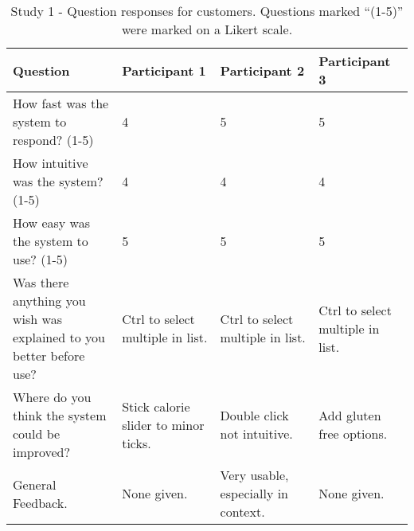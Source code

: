 \begin{table}[h]
    \centering
    \begin{tabular}{ |p{}|p{}|p{}|p{}| }
    \hline
    \textbf{Question} & \textbf{Participant 1} & \textbf{Participant 2} & \textbf{Participant 3} \\
    \hline
    How fast was the system to respond? (1-5) & 4 & 5 & 5 \\
    \hline
    How intuitive was the system? (1-5) & 4 & 4 & 4 \\
    \hline
    How easy was the system to use? (1-5) & 5 & 5 & 5 \\
    \hline
    Was there anything you wish was explained to you better before use? & Ctrl to select multiple in list. & Ctrl to select multiple in list. & Ctrl to select multiple in list. \\
    \hline
    Where do you think the system could be improved? & Stick calorie slider to minor ticks. & Double click not intuitive. & Add gluten free options. \\
    \hline
    General Feedback. & None given. & Very usable, especially in context. & None given. \\
    \hline
    \end{tabular}
    \captionsetup{justification=centering}
    \caption[Study 1 - Question responses from customers]{Study 1 - Question responses for customers. Questions marked ``(1-5)'' were marked on a Likert scale.}
    \label{tab:Study1AnswersC}
\end{table}


